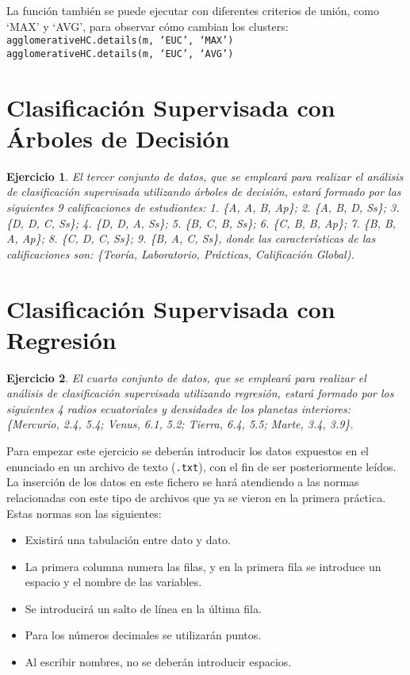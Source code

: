 \documentclass[12pt]{report}\usepackage[]{graphicx}\usepackage[dvipsnames]{xcolor}
\newtheorem{exercise}{Ejercicio}[section]
\begin{document}
	La función también se puede ejecutar con diferentes criterios de unión, como `MAX' y `AVG', para observar cómo cambian los clusters:\\
	
	\texttt{agglomerativeHC.details(m, `EUC', `MAX')}\\
	
	\texttt{agglomerativeHC.details(m, `EUC', `AVG')}
	
	\section{Clasificación Supervisada con Árboles de Decisión}
	
	\begin{exercise}
		El tercer conjunto de datos, que se empleará para realizar el análisis de clasificación supervisada utilizando árboles de decisión, estará formado por las siguientes 9 calificaciones de estudiantes: 1. \{A, A, B, Ap\}; 2. \{A, B, D, Ss\}; 3. \{D, D, C, Ss\}; 4. \{D, D, A, Ss\}; 5. \{B, C, B, Ss\}; 6. \{C, B, B, Ap\}; 7. \{B, B, A, Ap\}; 8. \{C, D, C, Ss\}; 9. \{B, A, C,
		Ss\}, donde las características de las calificaciones son: \{Teoría, Laboratorio, Prácticas, Calificación Global).
	\end{exercise}
	
	\newpage
	
	\section{Clasificación Supervisada con Regresión}
	
	\begin{exercise}
		El cuarto conjunto de datos, que se empleará para realizar el análisis de clasificación supervisada utilizando regresión, estará formado por los siguientes 4 radios ecuatoriales y densidades de los planetas interiores:
		\{Mercurio, 2.4, 5.4; Venus, 6.1, 5.2; Tierra, 6.4, 5.5; Marte, 3.4, 3.9\}.
	\end{exercise}
	
	Para empezar este ejercicio se deberán introducir los datos expuestos en el enunciado en un archivo de texto (\texttt{.txt}), con el fin de ser posteriormente leídos. La inserción de los datos en este fichero se hará atendiendo a las normas relacionadas con este tipo de archivos que ya se vieron en la primera práctica. Estas normas son las siguientes:
	
	\begin{itemize}
		\item Existirá una tabulación entre dato y dato. 
		\item La primera columna numera las filas, y en la primera fila se introduce un espacio y el nombre de las variables. 
		\item Se introducirá un salto de línea en la última fila. 
		\item Para los números decimales se utilizarán puntos. 
		\item Al escribir nombres, no se deberán introducir espacios. 
	\end{itemize}
	
\end{document}
